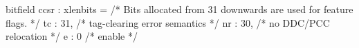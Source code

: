 bitfield ccsr : xlenbits = {
  /* Bits allocated from 31 downwards are used for feature flags. */
  tc      :  31,     /* tag-clearing error semantics */
  nr      :  30,     /* no DDC/PCC relocation */
  e       :  0       /* enable */
}
